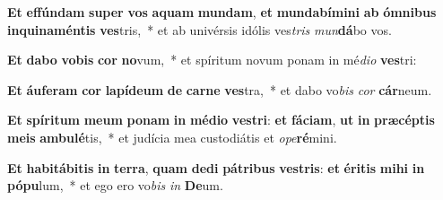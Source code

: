 \item \textbf{Et} \textbf{ef}\textbf{fún}\textbf{dam} \textbf{su}\textbf{per} \textbf{vos} \textbf{a}\textbf{quam} \textbf{mun}\textbf{dam}, \textbf{et} \textbf{mun}\textbf{da}\textbf{bí}\textbf{mi}\textbf{ni} \textbf{ab} \textbf{óm}\textbf{ni}\textbf{bus} \textbf{in}\textbf{qui}\textbf{na}\textbf{mén}\textbf{tis} \textbf{ves}tris,~* et ab univérsis idólis ves\textit{tris} \textit{mun}\textbf{dá}bo vos.
\item \textbf{Et} \textbf{da}\textbf{bo} \textbf{vo}\textbf{bis} \textbf{cor} \textbf{no}vum,~* et spíritum novum ponam in mé\textit{di}\textit{o} \textbf{ves}tri:
\item \textbf{Et} \textbf{áu}\textbf{fe}\textbf{ram} \textbf{cor} \textbf{la}\textbf{pí}\textbf{de}\textbf{um} \textbf{de} \textbf{car}\textbf{ne} \textbf{ves}tra,~* et dabo vo\textit{bis} \textit{cor} \textbf{cár}neum.
\item \textbf{Et} \textbf{spí}\textbf{ri}\textbf{tum} \textbf{me}\textbf{um} \textbf{po}\textbf{nam} \textbf{in} \textbf{mé}\textbf{di}\textbf{o} \textbf{ves}\textbf{tri}: \textbf{et} \textbf{fá}\textbf{ci}\textbf{am}, \textbf{ut} \textbf{in} \textbf{præ}\textbf{cép}\textbf{tis} \textbf{me}\textbf{is} \textbf{am}\textbf{bu}\textbf{lé}tis,~* et judícia mea custodiátis et \textit{o}\textit{pe}\textbf{ré}mini.
\item \textbf{Et} \textbf{ha}\textbf{bi}\textbf{tá}\textbf{bi}\textbf{tis} \textbf{in} \textbf{ter}\textbf{ra}, \textbf{quam} \textbf{de}\textbf{di} \textbf{pá}\textbf{tri}\textbf{bus} \textbf{ves}\textbf{tris}: \textbf{et} \textbf{é}\textbf{ri}\textbf{tis} \textbf{mi}\textbf{hi} \textbf{in} \textbf{pó}\textbf{pu}lum,~* et ego ero vo\textit{bis} \textit{in} \textbf{De}um.
